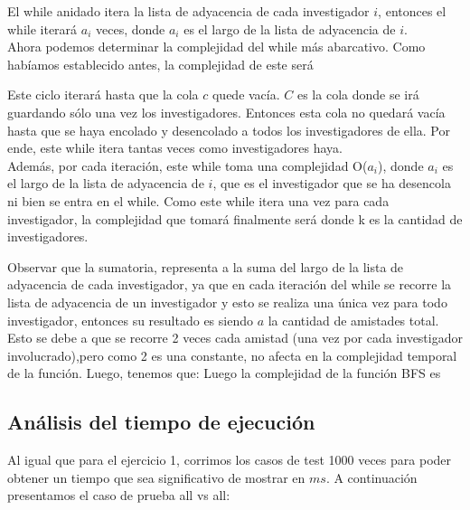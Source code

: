 \indent El while anidado itera la lista de adyacencia de cada investigador $i$,
entonces
el while iterará $a_i$ veces, donde $a_i$ es el largo
de la lista de adyacencia de $i$.\\

\indent Ahora podemos determinar la complejidad del while más abarcativo. Como
habíamos
establecido antes, la complejidad de este será 

\indent Este ciclo iterará hasta que la cola $c$ quede vacía. $C$ es la cola
donde se irá guardando
sólo una vez los investigadores. Entonces esta cola no quedará vacía hasta que
se haya encolado y desencolado 
a todos los investigadores de ella. Por ende, este while itera tantas veces como
investigadores haya.\\

\indent Además, por cada iteración, este while toma una complejidad O($a_i$),
donde $a_i$ es el largo
de la lista de adyacencia de $i$, que es el
investigador que se ha desencola ni bien se entra en el while. Como este while
itera una vez para cada investigador,
la complejidad que tomará finalmente será 
 donde k es la cantidad de investigadores.

\indent Observar que la sumatoria, representa a la suma del largo de la lista de
adyacencia de cada investigador, ya que en cada iteración del while se recorre
la lista de adyacencia de un investigador y esto se realiza una única vez para
todo investigador, entonces su resultado es 
siendo $a$ la cantidad de amistades total. Esto se debe a que se recorre 2 veces cada
amistad (una vez por cada investigador involucrado),pero como 2 es una
constante, no afecta
en la complejidad temporal de la función. Luego, tenemos que:
Luego la complejidad de la función BFS es 

\subsection{Análisis del tiempo de ejecución}
\indent Al igual que para el ejercicio 1, corrimos los casos de test 1000 veces para poder obtener un tiempo que sea significativo de mostrar en $ms$. A continuación presentamos el caso de prueba all vs all:

